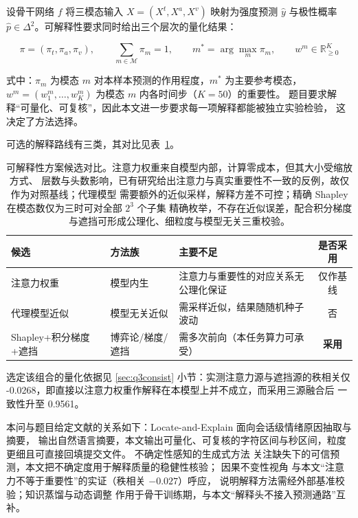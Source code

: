 \documentclass[withoutpreface,bwprint]{cumcmthesis}
\begin{document}
设骨干网络 $f$ 将三模态输入 $X=(X^{t},X^{a},X^{v})$ 映射为强度预测 $\hat y$ 与极性概率
$\hat p\in\Delta^{2}$。可解释性要求同时给出三个层次的量化结果：

\begin{equation}
\label{eq:q3pi}
\pi=(\pi_{t},\pi_{a},\pi_{v}),\qquad \sum_{m\in\mathcal{M}}\pi_{m}=1,\qquad
m^{\ast}=\arg\max_{m}\pi_{m},\qquad w^{m}\in\mathbb{R}_{\ge 0}^{K}
\end{equation}

式中：$\pi_{m}$ 为模态 $m$ 对本样本预测的作用程度，$m^{\ast}$ 为主要参考模态，
$w^{m}=(w^{m}_{1},\dots,w^{m}_{K})$ 为模态 $m$ 内各时间步（$K=50$）的重要性。
题目要求解释“可量化、可复核”，因此本文进一步要求每一项解释都能被独立实验检验，
这决定了方法选择。

可选的解释路线有三类，其对比见表~\ref{tab:q3cand}。

\begin{table}[H]
\centering
  \caption{可解释性方案候选对比。注意力权重来自模型内部，计算零成本，但其大小受缩放方式、
  层数与头数影响，已有研究给出注意力与真实重要性不一致的反例，故仅作为对照基线；代理模型
  需要额外的近似采样，解释方差不可控；精确 Shapley 在模态数仅为三时可对全部 $2^{3}$ 个子集
  精确枚举，不存在近似误差，配合积分梯度与遮挡可形成公理化、细粒度与模型无关三重校验。}
\label{tab:q3cand}
\begin{tabular}{p{2.4cm}p{3.4cm}p{4.2cm}c}
\toprule
候选 & 方法族 & 主要不足 & 是否采用 \\
\midrule
注意力权重 & 模型内生 & 注意力与重要性的对应关系无公理化保证 & 仅作基线 \\
代理模型近似 & 模型无关近似 & 需采样近似，结果随随机种子波动 & 否 \\
Shapley+积分梯度+遮挡 & 博弈论/梯度/遮挡 & 需多次前向（本任务算力可承受） & \textbf{采用} \\
\bottomrule
\end{tabular}
\end{table}

选定该组合的量化依据见 \ref{sec:q3consist} 小节：实测注意力源与遮挡源的秩相关仅
-0.0268，即直接以注意力权重作解释在本模型上并不成立，而采用三源融合后
一致性升至 0.9561。

本问与题目给定文献的关系如下：Locate-and-Explain\cite{ref15} 面向会话级情绪原因抽取与摘要，
输出自然语言摘要，本文输出可量化、可复核的字符区间与秒区间，粒度更细且可直接回填提交文件。
不确定性感知的生成式方法\cite{ref10} 关注缺失下的可信预测，本文把不确定度用于解释质量的稳健性核验；
因果不变性视角\cite{ref14} 与本文“注意力不等于重要性”的实证（秩相关 $-0.027$）呼应，
说明解释方法需经外部基准校验；知识蒸馏与动态调整\cite{ref18} 作用于骨干训练期，与本文“解释头不接入预测通路”互补。
\end{document}
